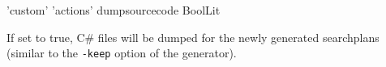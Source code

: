 \begin{rail}
  'custom' 'actions' dumpsourcecode BoolLit
\end{rail}
If set to true, C\# files will be dumped for the newly generated searchplans (similar to the \texttt{-keep} option of the generator).

